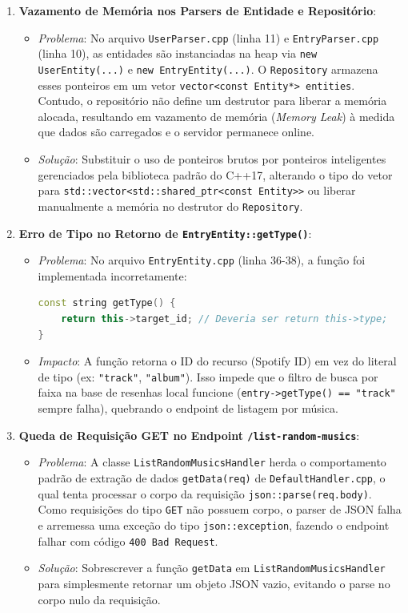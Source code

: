 \documentclass[12pt,a4paper]{article}
\begin{document}
\begin{enumerate}
    \item \textbf{Vazamento de Memória nos Parsers de Entidade e Repositório}:
    \begin{itemize}
        \item \textit{Problema}: No arquivo \texttt{UserParser.cpp} (linha 11) e \texttt{EntryParser.cpp} (linha 10), as entidades são instanciadas na heap via \texttt{new UserEntity(...)} e \texttt{new EntryEntity(...)}. O \texttt{Repository} armazena esses ponteiros em um vetor \texttt{vector<const Entity*> entities}. Contudo, o repositório não define um destrutor para liberar a memória alocada, resultando em vazamento de memória (\textit{Memory Leak}) à medida que dados são carregados e o servidor permanece online.
        \item \textit{Solução}: Substituir o uso de ponteiros brutos por ponteiros inteligentes gerenciados pela biblioteca padrão do C++17, alterando o tipo do vetor para \texttt{std::vector<std::shared\_ptr<const Entity>>} ou liberar manualmente a memória no destrutor do \texttt{Repository}.
    \end{itemize}
    
    \item \textbf{Erro de Tipo no Retorno de \texttt{EntryEntity::getType()}}:
    \begin{itemize}
        \item \textit{Problema}: No arquivo \texttt{EntryEntity.cpp} (linha 36-38), a função foi implementada incorretamente:
        \begin{lstlisting}[language=C++]
const string getType() {
    return this->target_id; // Deveria ser return this->type;
}
        \end{lstlisting}
        \item \textit{Impacto}: A função retorna o ID do recurso (Spotify ID) em vez do literal de tipo (ex: \texttt{"track"}, \texttt{"album"}). Isso impede que o filtro de busca por faixa na base de resenhas local funcione (\texttt{entry->getType() == "track"} sempre falha), quebrando o endpoint de listagem por música.
    \end{itemize}
    
    \item \textbf{Queda de Requisição GET no Endpoint \texttt{/list-random-musics}}:
    \begin{itemize}
        \item \textit{Problema}: A classe \texttt{ListRandomMusicsHandler} herda o comportamento padrão de extração de dados \texttt{getData(req)} de \texttt{DefaultHandler.cpp}, o qual tenta processar o corpo da requisição \texttt{json::parse(req.body)}. Como requisições do tipo \texttt{GET} não possuem corpo, o parser de JSON falha e arremessa uma exceção do tipo \texttt{json::exception}, fazendo o endpoint falhar com código \texttt{400 Bad Request}.
        \item \textit{Solução}: Sobrescrever a função \texttt{getData} em \texttt{ListRandomMusicsHandler} para simplesmente retornar um objeto JSON vazio, evitando o parse no corpo nulo da requisição.
    \end{itemize}
    

\end{enumerate}
\end{document}

